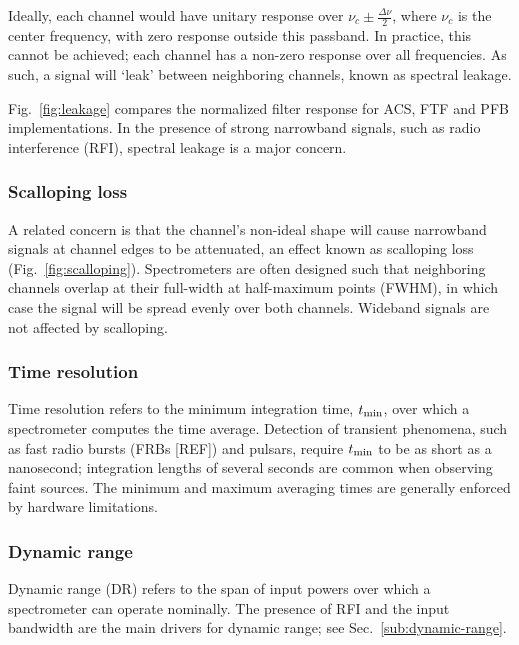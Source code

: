 \documentclass{ws-rv961x669}
\begin{document}
Ideally, each channel would have unitary response over $\nu_c \pm \frac{\Delta\nu}{2}$, where $\nu_c$ is the center frequency, with zero response outside this passband. In practice, this cannot be achieved; each channel has a non-zero response over all frequencies.  As such, a signal will `leak' between neighboring channels, known as spectral leakage.

Fig.~\ref{fig:leakage} compares the normalized filter response for ACS, FTF and PFB implementations. In the presence of strong narrowband signals, such as radio interference (RFI), spectral leakage is a major concern.

\subsubsection{Scalloping loss} 

A related concern is that the channel's non-ideal shape will cause narrowband signals at channel edges to be attenuated, an effect known as scalloping loss (Fig.~\ref{fig:scalloping}). Spectrometers are often designed such that neighboring channels overlap at their full-width at half-maximum points (FWHM), in which case the signal will be spread evenly over both channels. Wideband signals are not affected by scalloping. 

\subsubsection{Time resolution} 

Time resolution refers to the minimum integration time, $t_{\rm{min}}$, over which a spectrometer computes the time average. Detection of transient phenomena, such as fast radio bursts (FRBs [REF]) and pulsars, require $t_{\rm{min}}$ to be as short as a nanosecond; integration lengths of several seconds are common when observing faint sources. The minimum and maximum averaging times are generally enforced by hardware limitations.

\subsubsection{Dynamic range}
Dynamic range (DR) refers to the span of input powers over which a spectrometer can operate nominally. The presence of RFI and the input bandwidth are the main drivers for dynamic range; see Sec.~\ref{sub:dynamic-range}.

\end{document}
